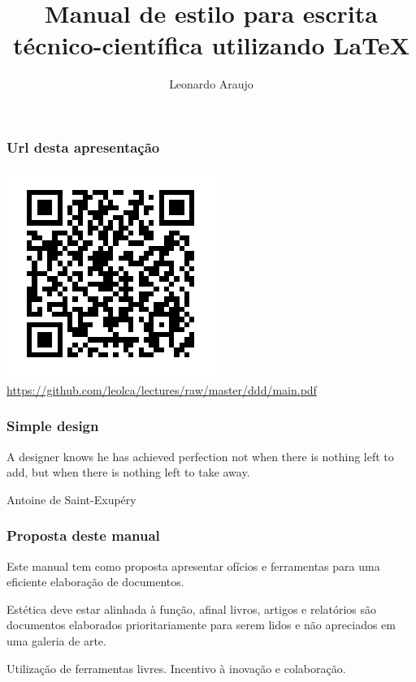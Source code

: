 \documentclass[10pt,notes,compress,aspectratio=169]{beamer}
\title[Manual de estilo]{Manual de estilo para escrita técnico-científica utilizando \LaTeX{}}
\author{Leonardo Araujo}
\institute{UFSJ}
\date{}
\begin{document}
\frame{\titlepage}

\begin{frame}
\frametitle{Url desta apresentação}
\centering
\includegraphics[width=0.5\linewidth,height=0.6\textheight,keepaspectratio]{figures/url.pdf}
\url{https://github.com/leolca/lectures/raw/master/ddd/main.pdf}
\end{frame}

\begin{frame}
\frametitle{Simple design}
\epigraph{A designer knows he has achieved perfection not when there is nothing left to add, but when there is nothing left to take away.}{Antoine de Saint-Exupéry}
\end{frame}


\begin{frame}
\frametitle{Proposta deste manual}
Este manual tem como proposta apresentar ofícios e ferramentas para uma eficiente elaboração
de documentos.
\pause

\vspace{3ex}
Estética deve estar alinhada à função, afinal livros, artigos e relatórios são documentos
elaborados prioritariamente para serem lidos e não apreciados em uma galeria de arte.
\pause

\vspace{3ex}
Utilização de ferramentas livres. Incentivo à inovação e colaboração.
\end{frame}
\end{document}
